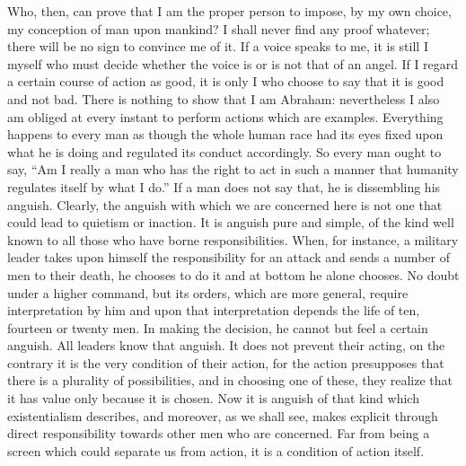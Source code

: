 \documentclass[12pt]{article}
\begin{document}
Who, then, can prove that I am the proper person to impose, by my own choice, my conception of man upon mankind? I shall never find any proof whatever; there will be no sign to convince me of it. If a voice speaks to me, it is still I myself who must decide whether the voice is or is not that of an angel. If I regard a certain course of action as good, it is only I who choose to say that it is good and not bad. There is nothing to show that I am Abraham: nevertheless I also am obliged at every instant to perform actions which are examples. Everything happens to every man as though the whole human race had its eyes fixed upon what he is doing and regulated its conduct accordingly. So every man ought to say, “Am I really a man who has the right to act in such a manner that humanity regulates itself by what I do.” If a man does not say that, he is dissembling his anguish. Clearly, the anguish with which we are concerned here is not one that could lead to quietism or inaction. It is anguish pure and simple, of the kind well known to all those who have borne responsibilities. When, for instance, a military leader takes upon himself the responsibility for an attack and sends a number of men to their death, he chooses to do it and at bottom he alone chooses. No doubt under a higher command, but its orders, which are more general, require interpretation by him and upon that interpretation depends the life of ten, fourteen or twenty men. In making the decision, he cannot but feel a certain anguish. All leaders know that anguish. It does not prevent their acting, on the contrary it is the very condition of their action, for the action presupposes that there is a plurality of possibilities, and in choosing one of these, they realize that it has value only because it is chosen. Now it is anguish of that kind which existentialism describes, and moreover, as we shall see, makes explicit through direct responsibility towards other men who are concerned. Far from being a screen which could separate us from action, it is a condition of action itself.
\end{document}
